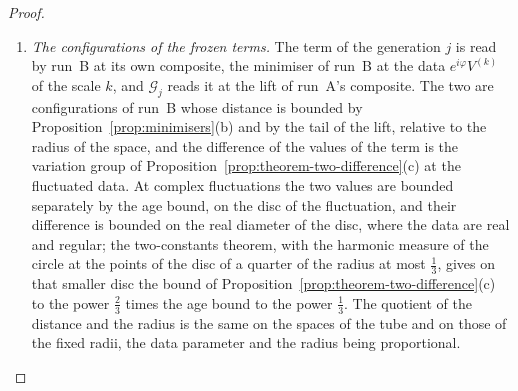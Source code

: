 \documentclass[11pt]{preprint}
\DeclarePairedDelimiter{\abs}{\lvert}{\rvert}
\numberwithin{equation}{section}
\theoremstyle{definition}
\theoremstyle{remark}
\theoremstyle{plain}
\begin{document}
\begin{proof}
\begin{enumerate}[label=(\arabic*)]
\begin{equation}
\begin{aligned}
    &+ \tfrac12\bigl\langle C_1(a), \Delta^AC_1(a)\bigr\rangle - R_3[b](a)\;,
\end{aligned}
\end{equation}
where $\Delta^A$ is the second variation \cite[(3.10), (3.12), p.~392]{BalabanPBG} of the action at $\mathbf U$, $V^X$ is the remainder of the third order of the action of run $X$ at its background, and $R_3[b]$ is the Taylor remainder of the third order of $a \mapsto b(e^{i(\varepsilon/L)a}W)$. Here $\abs{C_1(a)} \leq C_1\varepsilon\abs a^2$ by \cite[(123)]{BalabanAVG}, which is of the relative order $\varepsilon\abs a \leq CL^{-k}\vartheta_k$ against $Q_1a$, and the function $V^A$ and its gradient are bounded by constants times the third and the second power of their argument. The artefact $b$ is analytic in $a$ on a polydisc of a radius $\rho_b$ which does not depend on the coupling, in the units of the scale $k$, and it is bounded there by $C_b(\varepsilon/a_k)(\varepsilon_1 + \rho_b)^2$ per point: the proof of Proposition~\ref{prop:minimisers}(a) uses of the configuration only the bounds \eqref{eq:minimiser-regularity} and expansions which are identities between analytic functions, so that it holds at the complex configurations of this polydisc. Cauchy's estimate gives $\abs{R_3[b](a)} \leq 2C_bL^{-k}(\varepsilon_1 + \rho_b)^2(\abs a/\rho_b)^3$ per point for $\abs a \leq \frac12\rho_b$. Finally $V^B(a^B) - V^A(a^A)$ is the sum of \eqref{eq:remainder-difference} at $a = a^B$, less $V^A(Q_1a^B)$, and of $V^A(Q_1a^B) - V^A(a^A)$, which is at most a constant times $\abs{a}^2\abs{Q_1a^B - a^A}$ and is bounded by Proposition~\ref{prop:two-lattices}(h). Since $\abs{a^X} \leq C\vartheta_k$ in these units, all of this is at most a constant times $(L^{-k} + \delta_w(Y))g_k^{-2}\vartheta_k^3$ per point.
\item \emph{The configurations of the frozen terms.} The term of the generation $j$ is read by run~B at its own composite, the minimiser of run~B at the data $e^{i\varphi}V^{(k)}$ of the scale $k$, and $\mathcal G_j$ reads it at the lift of run~A's composite. The two are configurations of run~B whose distance is bounded by Proposition~\ref{prop:minimisers}(b) and by the tail of the lift, relative to the radius of the space, and the difference of the values of the term is the variation group of Proposition~\ref{prop:theorem-two-difference}(c) at the fluctuated data. At complex fluctuations the two values are bounded separately by the age bound, on the disc of the fluctuation, and their difference is bounded on the real diameter of the disc, where the data are real and regular; the two-constants theorem, with the harmonic measure of the circle at the points of the disc of a quarter of the radius at most $\frac13$, gives on that smaller disc the bound of Proposition~\ref{prop:theorem-two-difference}(c) to the power $\frac23$ times the age bound to the power $\frac13$. The quotient of the distance and the radius is the same on the spaces of the tube and on those of the fixed radii, the data parameter and the radius being proportional.

\end{enumerate}
\end{proof}
\end{document}
